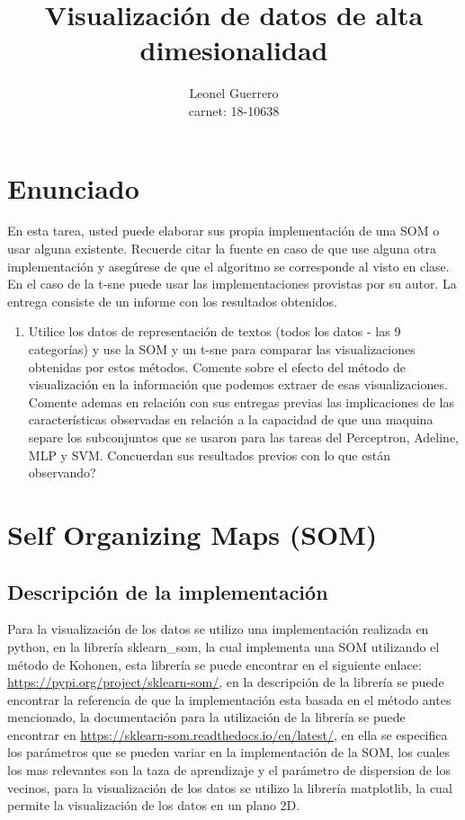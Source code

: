 \documentclass{article}
\title{Visualización de datos de alta dimesionalidad}
\author{Leonel Guerrero\\ carnet: 18-10638}
\theoremstyle{mytheoremstyle}
\theoremstyle{mytheoremstyle}
\theoremstyle{myproblemstyle}
\begin{document}
\maketitle

\section*{Enunciado}

En esta tarea, usted puede elaborar sus propia implementación de una SOM o usar alguna existente. Recuerde citar la fuente en caso de que use alguna otra implementación y asegúrese de que el algoritmo se corresponde al visto en clase. En el caso de la t-sne puede usar las implementaciones provistas por su autor. La entrega consiste de un informe con los resultados obtenidos.

\begin{enumerate}
  \item Utilice los datos de representación de textos (todos los datos - las 9 categorías) y use la SOM y un t-sne para comparar las visualizaciones obtenidas por estos métodos. Comente sobre el efecto del método de visualización en la información que podemos extraer de esas visualizaciones. Comente ademas en relación con sus entregas previas las implicaciones de las características observadas en relación a la capacidad de que una maquina separe los subconjuntos que se usaron para las tareas del Perceptron, Adeline, MLP y SVM. Concuerdan sus resultados previos con lo que están observando?
\end{enumerate}

\section*{Self Organizing Maps (SOM)}

\subsection*{Descripción de la implementación}

Para la visualización de los datos se utilizo una implementación realizada en python, en la librería sklearn\_som, la cual implementa una SOM utilizando el método de Kohonen, esta librería se puede encontrar en el siguiente enlace: \url{https://pypi.org/project/sklearn-som/}, en la descripción de la librería se puede encontrar la referencia de que la implementación esta basada en el método antes mencionado, la documentación para la utilización de la librería se puede encontrar en \url{https://sklearn-som.readthedocs.io/en/latest/}, en ella se especifica los parámetros que se pueden variar en la implementación de la SOM, los cuales los mas relevantes son la taza de aprendizaje y el parámetro de dispersion de los vecinos, para la visualización de los datos se utilizo la librería matplotlib, la cual permite la visualización de los datos en un plano 2D.
\\
\end{document}
